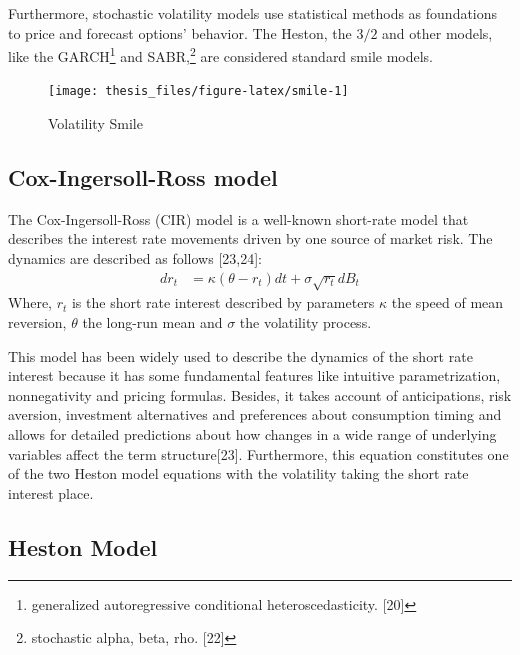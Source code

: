 \documentclass[12pt,twoside]{reedthesis}
\theoremstyle{definition}
\theoremstyle{definition}
\theoremstyle{remark}
\begin{document}
  
  Furthermore, stochastic volatility models use statistical methods as
  foundations to price and forecast options' behavior. The Heston, the
  \(3/2\) and other models, like the GARCH\footnote{generalized
    autoregressive conditional heteroscedasticity. {[}20{]}} and
  SABR,\footnote{stochastic alpha, beta, rho. {[}22{]}} are considered
  standard smile models.
  \begin{figure}
  
  {\centering \texttt{[image: thesis\_files/figure-latex/smile-1]} 
  
  }
  
  \caption{Volatility Smile \label{smile}}\label{fig:smile}
  \end{figure}
  \subsection{Cox-Ingersoll-Ross model}\label{cir}
  
  The Cox-Ingersoll-Ross (CIR) model is a well-known short-rate model that
  describes the interest rate movements driven by one source of market
  risk. The dynamics are described as follows {[}23,24{]}:
  \begin{align}
  \label{eq:cir}
  dr_t &= \kappa (\theta - r_t)dt + \sigma \sqrt{r_t} dB_t
  \end{align}
  \noindent
  Where, \(r_t\) is the short rate interest described by parameters
  \(\kappa\) the speed of mean reversion, \(\theta\) the long-run mean and
  \(\sigma\) the volatility process.
  
  This model has been widely used to describe the dynamics of the short
  rate interest because it has some fundamental features like intuitive
  parametrization, nonnegativity and pricing formulas. Besides, it takes
  account of anticipations, risk aversion, investment alternatives and
  preferences about consumption timing and allows for detailed predictions
  about how changes in a wide range of underlying variables affect the
  term structure{[}23{]}. Furthermore, this equation constitutes one of
  the two Heston model equations with the volatility taking the short rate
  interest place.
  
  \subsection{Heston Model}\label{hes1}
  
\end{document}
